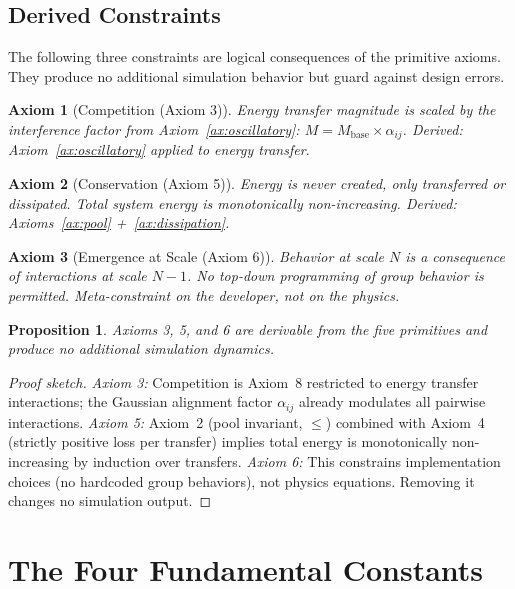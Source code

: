 \documentclass[11pt,a4paper]{article}
\newtheorem{axiom}{Axiom}
\newtheorem{proposition}{Proposition}
\begin{document}
\subsection{Derived Constraints}

The following three constraints are logical consequences of
the primitive axioms. They produce no additional simulation
behavior but guard against design errors.

\begin{axiom}[Competition (Axiom 3)]
\label{ax:competition}
Energy transfer magnitude is scaled by the interference
factor from Axiom~\ref{ax:oscillatory}:
$M = M_{\text{base}} \times \alpha_{ij}$.
\emph{Derived: Axiom~\ref{ax:oscillatory} applied to
energy transfer.}
\end{axiom}

\begin{axiom}[Conservation (Axiom 5)]
\label{ax:conservation}
Energy is never created, only transferred or dissipated.
Total system energy is monotonically non-increasing.
\emph{Derived: Axioms~\ref{ax:pool} +~\ref{ax:dissipation}.}
\end{axiom}

\begin{axiom}[Emergence at Scale (Axiom 6)]
\label{ax:emergence}
Behavior at scale $N$ is a consequence of interactions at
scale $N{-}1$. No top-down programming of group behavior
is permitted.
\emph{Meta-constraint on the developer, not on the physics.}
\end{axiom}

\begin{proposition}
\label{prop:derived}
Axioms 3, 5, and 6 are derivable from the five primitives
and produce no additional simulation dynamics.
\end{proposition}
\begin{proof}[Proof sketch]
\emph{Axiom 3:} Competition is Axiom~8 restricted to energy
transfer interactions; the Gaussian alignment factor
$\alpha_{ij}$ already modulates all pairwise interactions.
\emph{Axiom 5:} Axiom~2 (pool invariant, $\leq$) combined
with Axiom~4 (strictly positive loss per transfer) implies
total energy is monotonically non-increasing by induction
over transfers.
\emph{Axiom 6:} This constrains implementation choices
(no hardcoded group behaviors), not physics equations.
Removing it changes no simulation output.
\end{proof}

\section{The Four Fundamental Constants}
\label{sec:constants}
\end{document}

